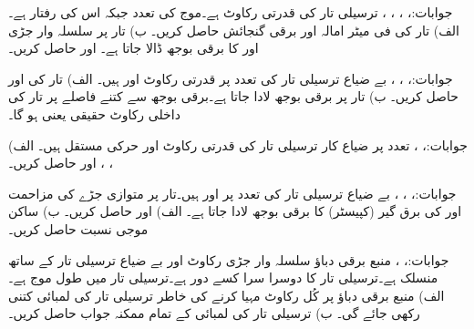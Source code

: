 جوابات:، ، ، ، 
ترسیلی تار کی قدرتی رکاوٹ  ہے۔موج کی تعدد  جبکہ اس کی رفتار  ہے۔ الف) تار کی فی میٹر امالہ اور برقی گنجائش حاصل کریں۔ ب) تار پر سلسلہ وار جڑی  اور  کا برقی بوجھ ڈالا جاتا ہے۔  اور  حاصل کریں۔

جوابات:، ، ، 
بے ضیاع ترسیلی تار کی  تعدد پر قدرتی رکاوٹ  اور  ہیں۔ الف) تار کی  اور  حاصل کریں۔ ب) تار پر  برقی بوجھ لادا جاتا ہے۔برقی بوجھ سے کتنے فاصلے پر تار کی داخلی رکاوٹ  حقیقی  یعنی  ہو گا۔

جوابات:، ،  
تعدد  پر ضیاع کار ترسیلی تار کی قدرتی رکاوٹ   اور حرکی مستقل  ہیں۔ الف) ، ،  اور  حاصل کریں۔

جوابات:، ، ، 
بے ضیاع ترسیلی تار کی  تعدد پر  اور  ہیں۔تار پر متوازی جڑے  کی مزاحمت اور  کی برق گیر (کپیسٹر)  کا برقی بوجھ لادا جاتا ہے۔ الف)  اور  حاصل کریں۔ ب) ساکن موجی نسبت حاصل کریں۔

جوابات:، ، 
منبع برقی دباؤ سلسلہ وار جڑی رکاوٹ  اور بے ضیاع ترسیلی تار کے ساتھ منسلک ہے۔ترسیلی تار کا دوسرا سرا کسے دور ہے۔ترسیلی تار میں طول موج  ہے۔ الف) منبع برقی دباؤ پر کُل  رکاوٹ مہیا کرنے کی خاطر ترسیلی تار کی لمبائی کتنی رکھی جائے گی۔ ب) ترسیلی تار کی لمبائی کے  تمام ممکنہ جواب حاصل کریں۔

